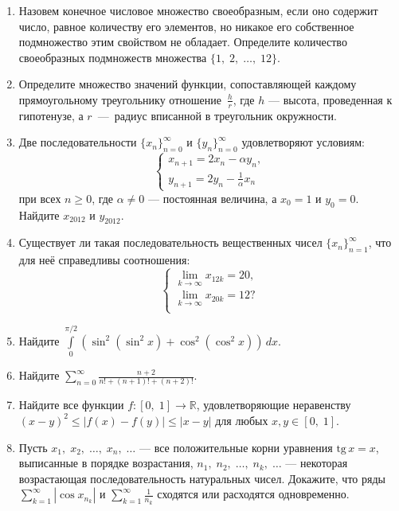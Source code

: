\begin{enumerate}
\item Назовем конечное числовое множество своеобразным, если оно содержит число, равное количеству его элементов, но никакое его собственное подмножество этим свойством не обладает. Определите количество своеобразных подмножеств множества $\{1,\;2,\;\dots,\;12\}$.

\item Определите множество значений функции, сопоставляющей каждому прямоугольному треугольнику отношение~$\displaystyle\frac{h}{r}$, где $h$ --- высота, проведенная к гипотенузе, а $r$~---~радиус вписанной в треугольник окружности.

\item Две последовательности $\{x_n\}_{n=0}^{\infty}$ и $\{y_n\}_{n=0}^\infty$ удовлетворяют условиям:
$$
\begin{cases}
x_{n+1}=2x_n-\alpha y_n,\\
y_{n+1}=2y_n-\displaystyle\frac{1}{\alpha} x_n
\end{cases}
$$
при всех $n\geqslant 0$, где $\alpha\not=0$ --- постоянная величина, а $x_0=1$ и $y_0=0$. Найдите $x_{2012}$ и $y_{2012}$.

\item Существует ли такая последовательность вещественных чисел $\{x_n\}_{n=1}^{\infty}$, что для неё справедливы соотношения: \begin{equation*}
\left\{
\begin{aligned}
\lim\limits_{k\to\infty}x_{12k} = 20,\\
\lim\limits_{k\to\infty}x_{20k} = 12?\\
\end{aligned}
\right.
\end{equation*}

\item Найдите $\displaystyle\int\limits_{0}^{\pi/2}\left(\sin^2(\sin^2x)+\cos^2(\cos^2x)\right)\,dx$.

\item Найдите $\displaystyle\sum\limits_{n=0}^{\infty}\frac{n+2}{n!+(n+1)!+(n+2)!}$.

\item Найдите все функции $f\colon[0,\;1]\to \mathbb R$, удовлетворяющие неравенству $(x-y)^2\leqslant |f(x)-f(y)|\leqslant|x-y|$ для любых $x, y\in[0,\;1]$.

\item Пусть $x_1,\;x_2,\;\dots,\;x_n,\;\dots$ --- все положительные корни уравнения $\mathrm{tg}\,x=x$, выписанные в порядке возрастания, $n_1,\;n_2,\;\dots,\;n_k,\;\dots$ --- некоторая возрастающая последовательность натуральных чисел. Докажите, что ряды $\displaystyle\sum\limits_{k=1}^{\infty} |\cos x_{n_k}|$ и $\displaystyle\sum\limits_{k=1}^{\infty}\frac{1}{n_k}$ сходятся или расходятся одновременно.


\end{enumerate}
